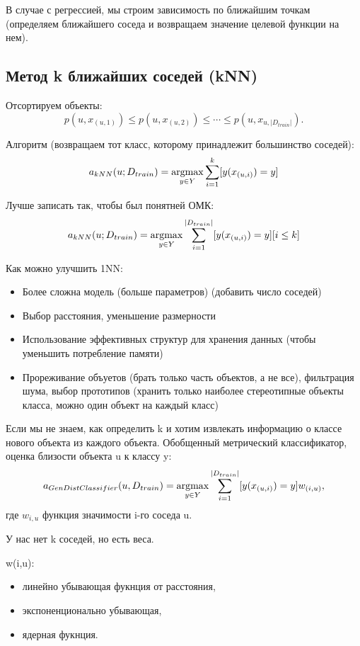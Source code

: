 В случае с регрессией, мы строим зависимость по ближайшим точкам (определяем ближайшего
соседа и возвращаем значение целевой функции на нем).

\subsection{Метод k ближайших соседей (kNN)}

Отсортируем объекты:
\[
    p(u, x_{(u, 1)}) \leq p(u, x_{(u,2)}) \leq \cdots \leq p(u, x_{u, |D_{train}|}).
\]

Алгоритм (возвращаем тот класс, которому принадлежит большинство соседей):
\[
    a_{kNN}(u; D_{train}) = \argmax_{y \in Y} \sum^k_{i = 1}[y(x_{(u,i)}) = y]

\]

Лучше записать так, чтобы был понятней ОМК:
\[
    a_{kNN}(u; D_{train}) = \operatorname*{argmax}_{y \in Y} \sum^{|D_{train}|}_{i = 1}[y(x_{(u,i)}) = y] [i \leq k]
\]

Как можно улучшить 1NN:
\begin{itemize}
    \item Более сложна модель (больше параметров) (добавить число соседей)
    \item Выбор расстояния, уменьшение размерности
    \item Использование эффективных структур для хранения данных (чтобы уменьшить потребление памяти)
    \item Прореживание объуетов (брать только часть объектов, а не все), фильтрация шума, выбор прототипов (хранить только наиболее стереотипные объекты класса, можно один объект на каждый класс)
\end{itemize}


Если мы не знаем, как определить k и хотим извлекать информацию о классе нового
объекта из каждого объекта.
Обобщенный метрический классификатор, оценка близости объекта u к классу y:
\[
    a_{GenDistClassifier}(u, D_{train}) = \operatorname*{argmax}_{y \in Y} \sum^{|D_{train}|}_{i = 1}
    [y(x_{(u,i)}) = y]w_{(i,u)},
\] где $w_{i, u}$ функция значимости i-го соседа u.

У нас нет k соседей, но есть веса.

w(i,u):
\begin{itemize}
    \item линейно убывающая фукнция от расстояния,
    \item экспоненционально убывающая,
    \item ядерная фукнция.
\end{itemize}

